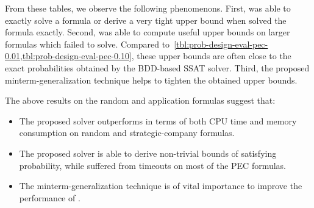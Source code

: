From these tables, we observe the following phenomenons.
First, \ressat was able to exactly solve a formula or derive a very tight upper bound
when \dcssat solved the formula exactly.
Second, \ressat was able to compute useful upper bounds on larger formulas which \dcssat failed to solve.
Compared to~\cref{tbl:prob-design-eval-pec-0.01,tbl:prob-design-eval-pec-0.10},
these upper bounds are often close to the exact probabilities obtained by the BDD-based SSAT solver.
Third, the proposed minterm-generalization technique helps to tighten the obtained upper bounds.

The above results on the random and application formulas suggest that:
\begin{itemize}
    \item The proposed solver \ressat outperforms \dcssat in terms of both CPU time and memory consumption on random and strategic-company formulas.
    \item The proposed solver \ressat is able to derive non-trivial bounds of satisfying probability,
          while \dcssat suffered from timeouts on most of the PEC formulas.
    \item The minterm-generalization technique is of vital importance to improve the performance of \ressat.
\end{itemize}
